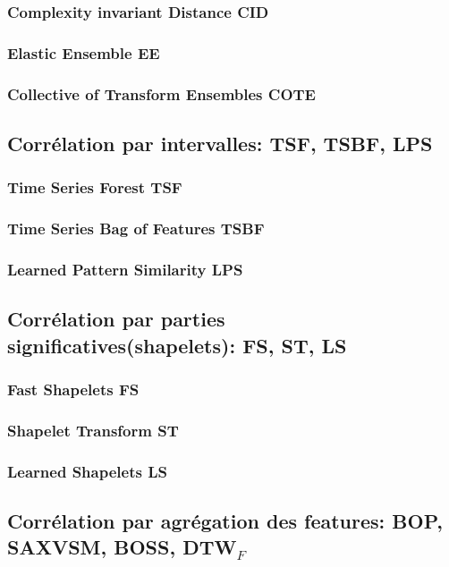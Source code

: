 \documentclass[onecolumn, 12pt]{book}
\begin{document}
			\subsubsection{Complexity invariant Distance CID}
			\subsubsection{Elastic Ensemble EE}
			\subsubsection{Collective of Transform Ensembles COTE}
			\subsubsection{}
		\subsection{Corr\'elation par intervalles: TSF, TSBF, LPS}
			\subsubsection{Time Series Forest TSF}
			\subsubsection{Time Series Bag of Features TSBF}
			\subsubsection{Learned Pattern Similarity LPS}
		\subsection{Corr\'elation par parties significatives(shapelets): FS, ST, LS}
			\subsubsection{Fast Shapelets FS}
			\subsubsection{Shapelet Transform ST}
			\subsubsection{Learned Shapelets LS}
		\subsection{Corr\'elation par agr\'egation des features: BOP, SAXVSM, BOSS,  DTW$_{F}$}
\end{document}

